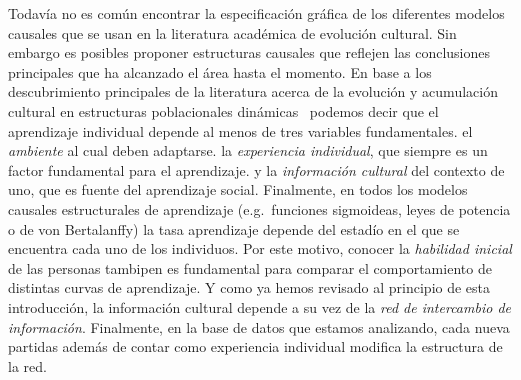 \documentclass[a4paper,11pt]{book}
\theoremstyle{definition}
\begin{document}
Todavía no es común encontrar la especificación gráfica de los diferentes modelos causales que se usan en la literatura académica de evolución cultural.
%
Sin embargo es posibles proponer estructuras causales que reflejen las conclusiones principales que ha alcanzado el área hasta el momento.
%
En base a los descubrimiento principales de la literatura acerca de la evolución y acumulación cultural en estructuras poblacionales dinámicas~\cite{Derex2020} podemos decir que el aprendizaje individual depende al menos de tres variables fundamentales.
%
el \emph{ambiente} al cual deben adaptarse.
%
la \emph{experiencia individual}, que siempre es un factor fundamental para el aprendizaje.
%
y la \emph{información cultural} del contexto de uno, que es fuente del aprendizaje social.
%
Finalmente, en todos los modelos causales estructurales de aprendizaje (e.g.\,\,\,funciones sigmoideas, leyes de potencia o de von Bertalanffy) la tasa aprendizaje depende del estadío en el que se encuentra cada uno de los individuos.
%
Por este motivo, conocer la \emph{habilidad inicial} de las personas tambipen es fundamental para comparar el comportamiento de distintas curvas de aprendizaje.
%
Y como ya hemos revisado al principio de esta introducción, la información cultural depende a su vez de la \emph{red de intercambio de información}.
%
Finalmente, en la base de datos que estamos analizando, cada nueva partidas además de contar como experiencia individual modifica la estructura de la red.
\end{document}
